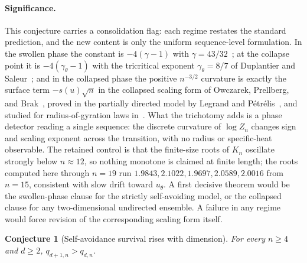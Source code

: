\documentclass[11pt]{article}
\newtheorem{conjecture}{Conjecture}
\theoremstyle{definition}
\begin{document}
\paragraph{Significance.}
This conjecture carries a consolidation flag: each regime restates the standard prediction, and the new content is only the uniform sequence-level formulation.  In the swollen phase the constant is $-4(\gamma-1)$ with $\gamma=43/32$~\cite{Nie82}; at the collapse point it is $-4(\gamma_\theta-1)$ with the tricritical exponent $\gamma_\theta=8/7$ of Duplantier and Saleur~\cite{DS87}; and in the collapsed phase the positive $n^{-3/2}$ curvature is exactly the surface term $-s(u)\sqrt n$ in the collapsed scaling form of Owczarek, Prellberg, and Brak~\cite{OPB93}, proved in the partially directed model by Legrand and P\'etr\'elis~\cite{LP22}, and studied for radius-of-gyration laws in~\cite{LDVB26}.  What the trichotomy adds is a phase detector reading a single sequence: the discrete curvature of $\log Z_n$ changes sign and scaling exponent across the transition, with no radius or specific-heat observable.  The retained control is that the finite-size roots of $K_n$ oscillate strongly below $n\approx12$, so nothing monotone is claimed at finite length; the roots computed here through $n=19$ run $1.9843,2.1022,1.9697,2.0589,2.0016$ from $n=15$, consistent with slow drift toward $u_\theta$.  A first decisive theorem would be the swollen-phase clause for the strictly self-avoiding model, or the collapsed clause for any two-dimensional undirected ensemble.  A failure in any regime would force revision of the corresponding scaling form itself.

\begin{conjecture}[Self-avoidance survival rises with dimension]\label{af14}
For every $n\ge4$ and $d\ge2$, $q_{d+1,n}>q_{d,n}$.
\end{conjecture}
\end{document}
